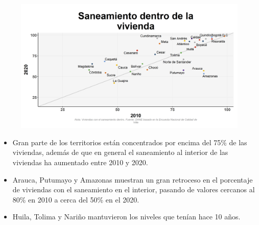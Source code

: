     \begin{figure}[H]
        \caption[Saneamiento dentro de la vivienda por departamentos - 2010 VS 2020 ]{\label{saneamiento_dentro_dptos_vs} }
        \begin{center}
        \includegraphics[width=\textwidth,keepaspectratio]{img/var_193_scatter_time.png}
        \end{center}
    \end{figure}
            \begin{itemize}
                    \item Gran parte de los territorios están concentrados por encima del 75\% de las viviendas, además de que en general el saneamiento al interior de las viviendas ha aumentado entre 2010 y 2020.
                    \item Arauca, Putumayo y Amazonas muestran un gran retroceso en el porcentaje de viviendas con el saneamiento en el interior, pasando de valores cercanos al 80\% en 2010 a cerca del 50\% en el 2020.
                    \item Huila, Tolima y Nariño mantuvieron los niveles que tenían hace 10 años.
                    \end{itemize}

